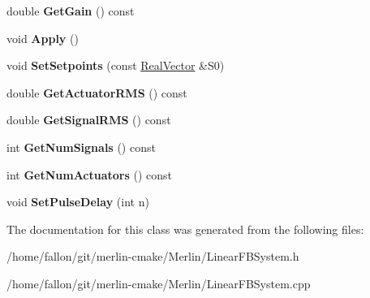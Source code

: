 \begin{DoxyCompactItemize}
\mbox{\label{classLinearFBSystem_a70c64767990f29b6488f92b4a837d3ba}} 
double {\bfseries Get\+Gain} () const
\item 
\mbox{\label{classLinearFBSystem_a5f4cd891580465d3da7e80f071a3021c}} 
void {\bfseries Apply} ()
\item 
\mbox{\label{classLinearFBSystem_a90f146cfb91547e2b9e5706b0da8d791}} 
void {\bfseries Set\+Setpoints} (const \hyperlink{classTLAS_1_1Vector}{Real\+Vector} \&S0)
\item 
\mbox{\label{classLinearFBSystem_a37a4e22a12d097bb8e9c83bf6b58977d}} 
double {\bfseries Get\+Actuator\+R\+MS} () const
\item 
\mbox{\label{classLinearFBSystem_ac8b3bc49328df575ca10191d42a799e7}} 
double {\bfseries Get\+Signal\+R\+MS} () const
\item 
\mbox{\label{classLinearFBSystem_ab2716a52d99476d7596f55d75ba2f174}} 
int {\bfseries Get\+Num\+Signals} () const
\item 
\mbox{\label{classLinearFBSystem_a09992dd8f591c7a9f525f5e4dc928814}} 
int {\bfseries Get\+Num\+Actuators} () const
\item 
\mbox{\label{classLinearFBSystem_a511fa59d0d021ae7957ea62d3cd9ae04}} 
void {\bfseries Set\+Pulse\+Delay} (int n)
\end{DoxyCompactItemize}


The documentation for this class was generated from the following files\+:\begin{DoxyCompactItemize}
\item 
/home/fallon/git/merlin-\/cmake/\+Merlin/Linear\+F\+B\+System.\+h\item 
/home/fallon/git/merlin-\/cmake/\+Merlin/Linear\+F\+B\+System.\+cpp\end{DoxyCompactItemize}
